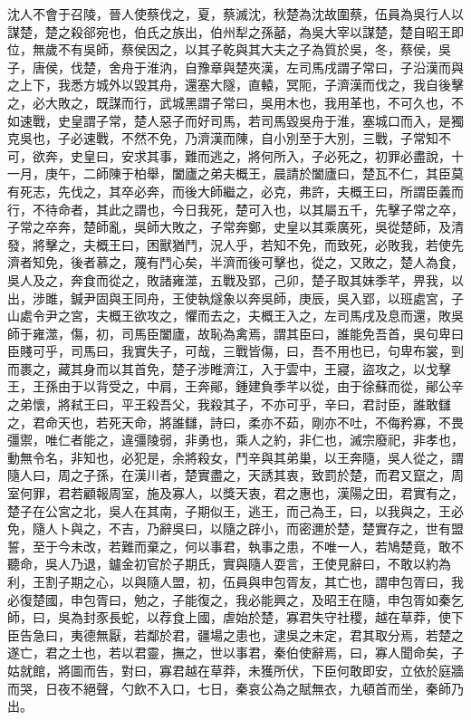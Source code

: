 \begin{pinyinscope}
沈人不會于召陵，晉人使蔡伐之，夏，蔡滅沈，秋楚為沈故圍蔡，伍員為吳行人以謀楚，楚之殺郤宛也，伯氏之族出，伯州犁之孫嚭，為吳大宰以謀楚，楚自昭王即位，無歲不有吳師，蔡侯因之，以其子乾與其大夫之子為質於吳，冬，蔡侯，吳子，唐侯，伐楚，舍舟于淮汭，自豫章與楚夾漢，左司馬戌謂子常曰，子沿漢而與之上下，我悉方城外以毀其舟，還塞大隧，直轅，冥阨，子濟漢而伐之，我自後擊之，必大敗之，既謀而行，武城黑謂子常曰，吳用木也，我用革也，不可久也，不如速戰，史皇謂子常，楚人惡子而好司馬，若司馬毀吳舟于淮，塞城口而入，是獨克吳也，子必速戰，不然不免，乃濟漢而陳，自小別至于大別，三戰，子常知不可，欲奔，史皇曰，安求其事，難而逃之，將何所入，子必死之，初罪必盡說，十一月，庚午，二師陳于柏舉，闔廬之弟夫概王，晨請於闔廬曰，楚瓦不仁，其臣莫有死志，先伐之，其卒必奔，而後大師繼之，必克，弗許，夫概王曰，所謂臣義而行，不待命者，其此之謂也，今日我死，楚可入也，以其屬五千，先擊子常之卒，子常之卒奔，楚師亂，吳師大敗之，子常奔鄭，史皇以其乘廣死，吳從楚師，及清發，將擊之，夫概王曰，困獸猶鬥，況人乎，若知不免，而致死，必敗我，若使先濟者知免，後者慕之，蔑有鬥心矣，半濟而後可擊也，從之，又敗之，楚人為食，吳人及之，奔食而從之，敗諸雍澨，五戰及郢，己卯，楚子取其妹季芊，畀我，以出，涉雎，鍼尹固與王同舟，王使執燧象以奔吳師，庚辰，吳入郢，以班處宮，子山處令尹之宮，夫概王欲攻之，懼而去之，夫概王入之，左司馬戌及息而還，敗吳師于雍澨，傷，初，司馬臣闔廬，故恥為禽焉，謂其臣曰，誰能免吾首，吳句卑曰臣賤可乎，司馬曰，我實失子，可哉，三戰皆傷，曰，吾不用也已，句卑布裳，剄而裹之，藏其身而以其首免，楚子涉睢濟江，入于雲中，王寢，盜攻之，以戈擊王，王孫由于以背受之，中肩，王奔鄖，鍾建負季芊以從，由于徐蘇而從，鄖公辛之弟懷，將弒王曰，平王殺吾父，我殺其子，不亦可乎，辛曰，君討臣，誰敢讎之，君命天也，若死天命，將誰讎，詩曰，柔亦不茹，剛亦不吐，不侮矜寡，不畏彊禦，唯仁者能之，違彊陵弱，非勇也，乘人之約，非仁也，滅宗廢祀，非孝也，動無令名，非知也，必犯是，余將殺女，鬥辛與其弟巢，以王奔隨，吳人從之，謂隨人曰，周之子孫，在漢川者，楚實盡之，天誘其衷，致罰於楚，而君又竄之，周室何罪，君若顧報周室，施及寡人，以獎天衷，君之惠也，漢陽之田，君實有之，楚子在公宮之北，吳人在其南，子期似王，逃王，而己為王，曰，以我與之，王必免，隨人卜與之，不吉，乃辭吳曰，以隨之辟小，而密邇於楚，楚實存之，世有盟誓，至于今未改，若難而棄之，何以事君，執事之患，不唯一人，若鳩楚竟，敢不聽命，吳人乃退，鑪金初官於子期氏，實與隨人耍言，王使見辭曰，不敢以約為利，王割子期之心，以與隨人盟，初，伍員與申包胥友，其亡也，謂申包胥曰，我必復楚國，申包胥曰，勉之，子能復之，我必能興之，及昭王在隨，申包胥如秦乞師，曰，吳為封豕長蛇，以荐食上國，虐始於楚，寡君失守社稷，越在草莽，使下臣告急曰，夷德無厭，若鄰於君，疆場之患也，逮吳之未定，君其取分焉，若楚之遂亡，君之土也，若以君靈，撫之，世以事君，秦伯使辭焉，曰，寡人聞命矣，子姑就館，將圖而告，對曰，寡君越在草莽，未獲所伏，下臣何敢即安，立依於庭牆而哭，日夜不絕聲，勺飲不入口，七日，秦哀公為之賦無衣，九頓首而坐，秦師乃出。


\end{pinyinscope}

